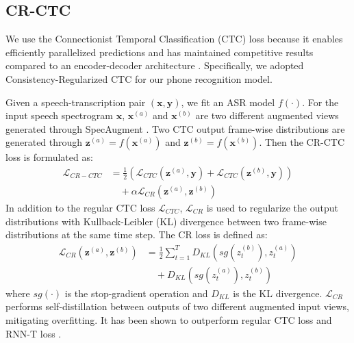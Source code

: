 \documentclass[11pt]{article}
\begin{document}
\subsection{CR-CTC}
We use the Connectionist Temporal Classification (CTC) loss \cite{graves2006connectionist} because it enables efficiently parallelized predictions and has maintained competitive results compared to an encoder-decoder architecture \cite{peng2024owsm}. Specifically, we adopted Consistency-Regularized CTC \cite{yao2025crctc} for our phone recognition model. 

Given a speech-transcription pair $(\mathbf{x},\mathbf{y})$, we fit an ASR model $f(\cdot)$. For the input speech spectrogram $\mathbf{x}$, $\mathbf{x}^{(a)}$ and $\mathbf{x}^{(b)}$ are two different augmented views generated through SpecAugment \cite{park19e_interspeech}. Two CTC output frame-wise distributions are generated through $\mathbf{z}^{(a)}=f(\mathbf{x}^{(a)})$ and $\mathbf{z}^{(b)}=f(\mathbf{x}^{(b)})$. 
Then the CR-CTC loss is formulated as:
\begin{align*}
\mathcal{L}_{CR-CTC} &= \frac{1}{2}\left( \mathcal{L}_{CTC}(\mathbf{z}^{(a)}, \mathbf{y}) + \mathcal{L}_{CTC}(\mathbf{z}^{(b)}, \mathbf{y}) \right) \\
            &\quad + \alpha \mathcal{L}_{CR}(\mathbf{z}^{(a)}, \mathbf{z}^{(b)})
\end{align*}
In addition to the regular CTC loss $\mathcal{L}_{CTC}$, $\mathcal{L}_{CR}$ is used to regularize the output distributions with Kullback-Leibler (KL) divergence between two frame-wise distributions at the same time step. The CR loss is defined as:
\begin{align*}
\mathcal{L}_{CR}(\mathbf{z}^{(a)}, \mathbf{z}^{(b)}) &= \frac{1}{2}\sum_{t=1}^{T}D_{KL}\left(sg(z_t^{(b)}),z_t^{(a)}\right) \\
            &\quad + D_{KL}\left(sg(z_t^{(a)}),z_t^{(b)}\right)
\end{align*}
where $sg(\cdot)$ is the stop-gradient operation and $D_{KL}$ is the KL divergence. $\mathcal{L}_{CR}$ performs self-distillation between outputs of two different augmented input views, mitigating overfitting. It has been shown to outperform regular CTC loss and RNN-T loss \cite{yao2025crctc}. 
\end{document}
